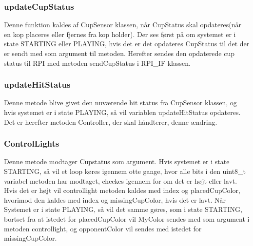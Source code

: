 \documentclass[Softwaredesign/Softwaredesign_main.tex]{subfiles}
\begin{document}
\subsubsection{updateCupStatus}
Denne funktion kaldes af CupSensor klassen, når CupStatus skal opdateres(når en kop placeres eller fjernes fra kop holder). Der ses først på om systemet er i state STARTING eller PLAYING, hvis det er det opdateres CupStatus til det der er sendt med som argument til metoden. Herefter sendes den opdaterede cup 
status til RPI med metoden sendCupStatus i RPI\_IF klassen. 
\subsubsection{updateHitStatus}
Denne metode blive givet den nuværende hit status fra CupSensor klassen, og hvis systemet er i state PLAYING, så vil variablen updateHitStatus opdateres. Det er herefter metoden Controller, der skal håndterer, denne ændring.
\subsubsection{ControlLights}
Denne metode modtager Cupstatus som argument. Hvis systemet er i state STARTING, så vil et loop køres igennem otte gange, hvor alle bits i den uint8\_t variabel metoden har modtaget, checkes igennem for om det er højt eller lavt. Hvis det er højt vil controllight metoden kaldes med index og placedCupColor, hvorimod den kaldes med index og missingCupColor, hvis det er lavt. Når Systemet er i state PLAYING, så vil det samme gøres, som i state STARTING, bortset fra at istedet for placedCupColor vil MyColor sendes med som argument i metoden controllight, og opponentColor vil sendes med istedet for missingCupColor.
\end{document}
